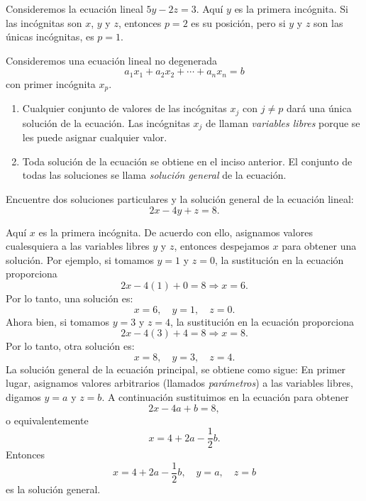 \begin{examplebox}{}{}
    Consideremos la ecuación lineal $5y - 2z = 3$. Aquí $y$ es la primera incógnita. Si las incógnitas son $x$, $y$ y $z$, entonces $p = 2$ es su posición, pero si $y$ y $z$ son las únicas incógnitas, es $p = 1$.
\end{examplebox}

\begin{theorem}{}{}
    Consideremos una ecuación lineal no degenerada
    $$a_1x_1 + a_2x_2 + \cdots + a_nx_n = b$$
    con primer incógnita $x_p$.
    \begin{enumerate}[label=\roman*), topsep=6pt, itemsep=0pt]
        \item Cualquier conjunto de valores de las incógnitas $x_j$ con $j \neq p$ dará una única solución de la ecuación. Las incógnitas $x_j$ de llaman \emph{variables libres} porque se les puede asignar cualquier valor.
        \item Toda solución de la ecuación se obtiene en el inciso anterior. El conjunto de todas las soluciones se llama \emph{solución general} de la ecuación.
    \end{enumerate}
\end{theorem}

\begin{examplebox}{}{}
    Encuentre dos soluciones particulares y la solución general de la ecuación lineal:
    $$2x - 4y + z = 8.$$

    \tcblower
    \solucion Aquí $x$ es la primera incógnita. De acuerdo con ello, asignamos valores cualesquiera a las variables libres $y$ y $z$, entonces despejamos $x$ para obtener una solución. Por ejemplo, si tomamos $y = 1$ y $z = 0$, la sustitución en la ecuación proporciona
    $$2x - 4(1) + 0 = 8 \Longrightarrow x = 6.$$
    Por lo tanto, una solución es:
    $$x = 6, \quad y = 1, \quad z = 0.$$
    Ahora bien, si tomamos $y = 3$ y $z = 4$, la sustitución en la ecuación proporciona
    $$2x - 4(3) + 4 = 8 \Longrightarrow x = 8.$$
    Por lo tanto, otra solución es:
    $$x = 8, \quad y = 3, \quad z = 4.$$
    La solución general de la ecuación principal, se obtiene como sigue: En primer lugar, asignamos valores arbitrarios (llamados \textit{parámetros}) a las variables libres, digamos $y = a$ y $z = b$. A continuación sustituimos en la ecuación para obtener
    $$2x - 4a + b = 8,$$
    o equivalentemente
    $$x = 4 + 2a - \frac{1}{2}b.$$
    Entonces
    $$x = 4 + 2a - \frac{1}{2}b, \quad y = a, \quad z = b$$
    es la solución general.
\end{examplebox}

